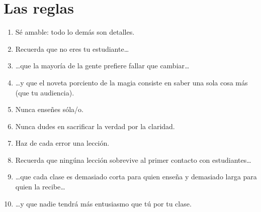 \chapter*{Las reglas}

\begin{enumerate}

\item Sé amable: todo lo demás son detalles.\\

\item Recuerda que no eres tu estudiante{\ldots}\\

\item {\ldots}que la mayoría de la gente prefiere fallar que cambiar{\ldots}\\

\item {\ldots}y que el noveta porciento de la magia consiste en saber una sola cosa más (que tu audiencia).\\

\item Nunca enseñes sóla/o.\\

\item Nunca dudes en sacrificar la verdad por la claridad.\\

\item Haz de cada error una lección.\\

\item Recuerda que ningúna lección sobrevive al primer contacto con estudiantes{\ldots}\\

\item {\ldots}que cada clase es demasiado corta para quien enseña y demasiado larga para quien la recibe{\ldots}\\

\item {\ldots}y que nadie tendrá más entusiasmo que tú por tu clase.

\end{enumerate}
